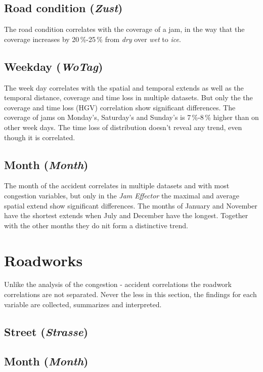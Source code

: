\subsection{Road condition (\textit{Zust})}
The road condition correlates with the coverage of a jam, in the way that the coverage increases by 20\,\%-25\,\% from \textit{dry} over \textit{wet} to \textit{ice}.

\subsection{Weekday (\textit{WoTag})}
The week day correlates with the spatial and temporal extends as well as the temporal distance, coverage and time loss in multiple datasets. But only the the coverage and time loss (HGV) correlation show significant differences. The coverage of jams on Monday's, Saturday's and Sunday's is 7\,\%-8\,\% higher than on other week days. The time loss of distribution doesn't reveal any trend, even though it is correlated.

\subsection{Month (\textit{Month})}
The month of the accident correlates in multiple datasets and with most congestion variables, but only in the \textit{Jam Effector} the maximal and average spatial extend show significant differences. The months of January and November have the shortest extends when July and December have the longest. Together with the other months they do nit form a distinctive trend. 

\section{Roadworks}
Unlike the analysis of the congestion - accident correlations the roadwork correlations are not separated. Never the less in this section, the findings for each variable are collected, summarizes and interpreted. 

\subsection{Street (\textit{Strasse})}

\subsection{Month (\textit{Month})}


